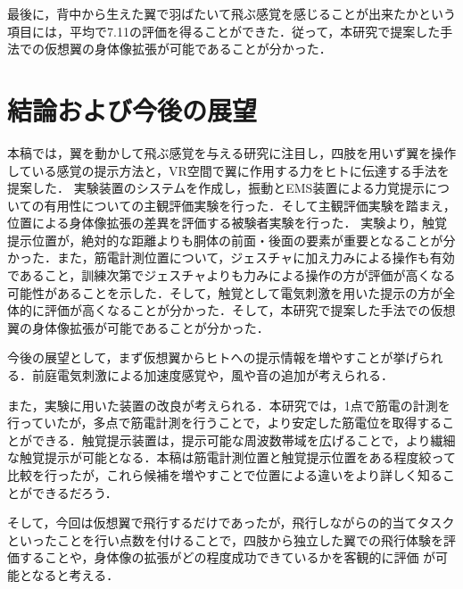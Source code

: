 \begin{small}
        最後に，背中から生えた翼で羽ばたいて飛ぶ感覚を感じることが出来たかという項目には，平均で7.11の評価を得ることができた．従って，本研究で提案した手法での仮想翼の身体像拡張が可能であることが分かった．


\section{結論および今後の展望}
    本稿では，翼を動かして飛ぶ感覚を与える研究に注目し，四肢を用いず翼を操作している感覚の提示方法と，VR空間で翼に作用する力をヒトに伝達する手法を提案した．
    実験装置のシステムを作成し，振動とEMS装置による力覚提示についての有用性についての主観評価実験を行った．そして主観評価実験を踏まえ，位置による身体像拡張の差異を評価する被験者実験を行った．
    実験より，触覚提示位置が，絶対的な距離よりも胴体の前面・後面の要素が重要となることが分かった．また，筋電計測位置について，ジェスチャに加え力みによる操作も有効であること，訓練次第でジェスチャよりも力みによる操作の方が評価が高くなる可能性があることを示した．そして，触覚として電気刺激を用いた提示の方が全体的に評価が高くなることが分かった．そして，本研究で提案した手法での仮想翼の身体像拡張が可能であることが分かった．

    
    今後の展望として，まず仮想翼からヒトへの提示情報を増やすことが挙げられる．前庭電気刺激による加速度感覚\cite{maeda2005shaking}や，風や音の追加が考えられる．

    また，実験に用いた装置の改良が考えられる．本研究では，1点で筋電の計測を行っていたが，多点で筋電計測を行うことで，より安定した筋電位を取得することができる．触覚提示装置は，提示可能な周波数帯域を広げることで，より繊細な触覚提示が可能となる．本稿は筋電計測位置と触覚提示位置をある程度絞って比較を行ったが，これら候補を増やすことで位置による違いをより詳しく知ることができるだろう．

    そして，今回は仮想翼で飛行するだけであったが，飛行しながらの的当てタスクといったことを行い点数を付けることで，四肢から独立した翼での飛行体験を評価することや，身体像の拡張がどの程度成功できているかを客観的に評価
    が可能となると考える．
  


{
\scriptsize %


}

\end{small}

